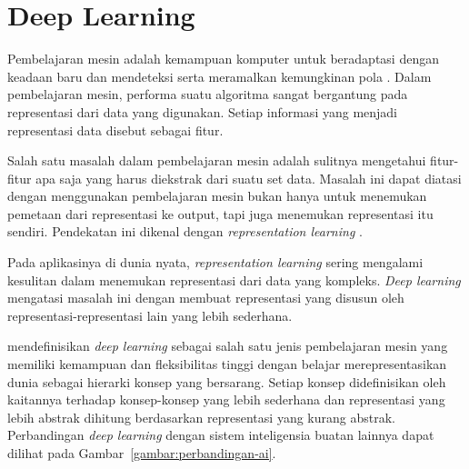 \section{Deep Learning}
Pembelajaran mesin adalah kemampuan komputer untuk beradaptasi dengan keadaan baru dan mendeteksi serta meramalkan kemungkinan pola \Parencite{Russell:2009:AIM:1671238}. Dalam pembelajaran mesin, performa suatu algoritma sangat bergantung pada representasi dari data yang digunakan. Setiap informasi yang menjadi representasi data disebut sebagai fitur.

Salah satu masalah dalam pembelajaran mesin adalah sulitnya mengetahui fitur-fitur apa saja yang harus diekstrak dari suatu set data. Masalah ini dapat diatasi dengan menggunakan pembelajaran mesin bukan hanya untuk menemukan pemetaan dari representasi ke output, tapi juga menemukan representasi itu sendiri. Pendekatan ini dikenal dengan \textit{representation learning} \Parencite{Goodfellow-2016}.

Pada aplikasinya di dunia nyata, \textit{representation learning} sering mengalami kesulitan dalam menemukan representasi dari data yang kompleks. \textit{Deep learning} mengatasi masalah ini dengan membuat representasi yang disusun oleh representasi-representasi lain yang lebih sederhana.

\citeauthor{Goodfellow-2016} mendefinisikan \textit{deep learning} sebagai salah satu jenis pembelajaran mesin yang memiliki kemampuan dan fleksibilitas tinggi dengan belajar merepresentasikan dunia sebagai hierarki konsep yang bersarang. Setiap konsep didefinisikan oleh kaitannya terhadap konsep-konsep yang lebih sederhana dan representasi yang lebih abstrak dihitung berdasarkan representasi yang kurang abstrak. Perbandingan \textit{deep learning} dengan sistem inteligensia buatan lainnya dapat dilihat pada Gambar~\ref{gambar:perbandingan-ai}.

